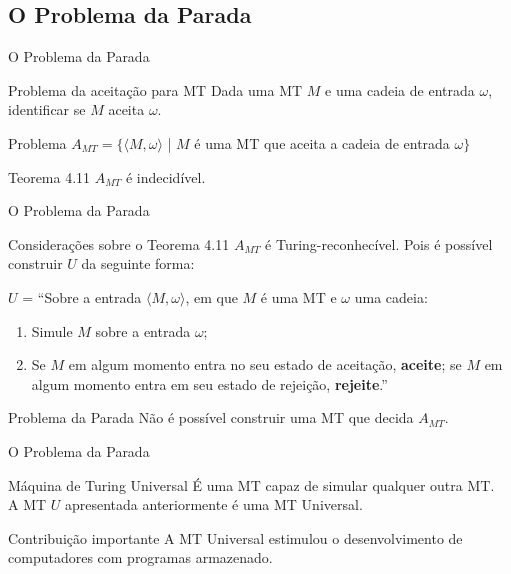 \documentclass[xcolor=dvipsnames,table]{beamer}
\begin{document}
	\subsection{O Problema da Parada}
	\begin{frame}{O Problema da Parada}
		\begin{block}{Problema da aceitação para MT}
			Dada uma MT $M$ e uma cadeia de entrada $\omega$, identificar se $M$ aceita $\omega$.
		\end{block}	\pause
		\begin{block}{Problema}
			$A_{MT} = \{ \langle M, \omega \rangle$  | $M$ é uma MT que aceita a cadeia de entrada $\omega \}$
		\end{block} 
		\begin{alertblock}{Teorema 4.11}
			$A_{MT}$ é indecidível.
		\end{alertblock}
	\end{frame}
	
	\begin{frame}{O Problema da Parada}
		\begin{block}{Considerações sobre o Teorema 4.11}
			$A_{MT}$ é Turing-reconhecível. Pois é possível construir $U$ da seguinte forma: \pause
			
			$U$ = ``Sobre a entrada $\langle M, \omega \rangle$, em que $M$ é uma MT e $\omega$ uma cadeia:
			\begin{enumerate}
				\item Simule $M$ sobre a entrada $\omega$;
				\item Se $M$ em algum momento entra no seu estado de aceitação, {\bf aceite}; se $M$ em algum momento entra em seu estado de rejeição, {\bf rejeite}.''
			\end{enumerate}
		\end{block}
		\begin{alertblock}{Problema da Parada}
			Não é possível construir uma MT que decida $A_{MT}$.
		\end{alertblock} 
	\end{frame}
	
	\begin{frame}{O Problema da Parada}
		\begin{block}{Máquina de Turing Universal}
			É uma MT capaz de simular qualquer outra MT. \\A MT $U$ apresentada anteriormente é uma MT Universal.
		\end{block}
		\begin{exampleblock}{Contribuição importante}
			A MT Universal estimulou o desenvolvimento de computadores com programas armazenado.
		\end{exampleblock} 
	\end{frame}
	
\end{document}
